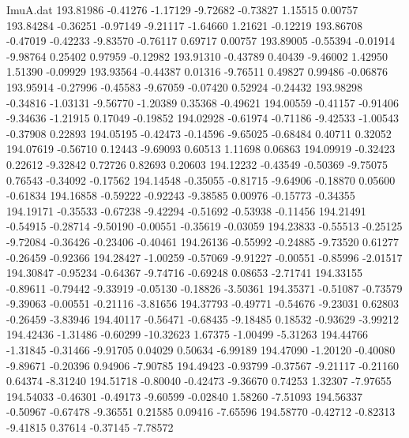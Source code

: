 \begin{filecontents}{ImuA.dat}
 193.81986   -0.41276   -1.17129   -9.72682   -0.73827    1.15515    0.00757
 193.84284   -0.36251   -0.97149   -9.21117   -1.64660    1.21621   -0.12219
 193.86708   -0.47019   -0.42233   -9.83570   -0.76117    0.69717    0.00757
 193.89005   -0.55394   -0.01914   -9.98764    0.25402    0.97959   -0.12982
 193.91310   -0.43789    0.40439   -9.46002    1.42950    1.51390   -0.09929
 193.93564   -0.44387    0.01316   -9.76511    0.49827    0.99486   -0.06876
 193.95914   -0.27996   -0.45583   -9.67059   -0.07420    0.52924   -0.24432
 193.98298   -0.34816   -1.03131   -9.56770   -1.20389    0.35368   -0.49621
 194.00559   -0.41157   -0.91406   -9.34636   -1.21915    0.17049   -0.19852
 194.02928   -0.61974   -0.71186   -9.42533   -1.00543   -0.37908    0.22893
 194.05195   -0.42473   -0.14596   -9.65025   -0.68484    0.40711    0.32052
 194.07619   -0.56710    0.12443   -9.69093    0.60513    1.11698    0.06863
 194.09919   -0.32423    0.22612   -9.32842    0.72726    0.82693    0.20603
 194.12232   -0.43549   -0.50369   -9.75075    0.76543   -0.34092   -0.17562
 194.14548   -0.35055   -0.81715   -9.64906   -0.18870    0.05600   -0.61834
 194.16858   -0.59222   -0.92243   -9.38585    0.00976   -0.15773   -0.34355
 194.19171   -0.35533   -0.67238   -9.42294   -0.51692   -0.53938   -0.11456
 194.21491   -0.54915   -0.28714   -9.50190   -0.00551   -0.35619   -0.03059
 194.23833   -0.55513   -0.25125   -9.72084   -0.36426   -0.23406   -0.40461
 194.26136   -0.55992   -0.24885   -9.73520    0.61277   -0.26459   -0.92366
 194.28427   -1.00259   -0.57069   -9.91227   -0.00551   -0.85996   -2.01517
 194.30847   -0.95234   -0.64367   -9.74716   -0.69248    0.08653   -2.71741
 194.33155   -0.89611   -0.79442   -9.33919   -0.05130   -0.18826   -3.50361
 194.35371   -0.51087   -0.73579   -9.39063   -0.00551   -0.21116   -3.81656
 194.37793   -0.49771   -0.54676   -9.23031    0.62803   -0.26459   -3.83946
 194.40117   -0.56471   -0.68435   -9.18485    0.18532   -0.93629   -3.99212
 194.42436   -1.31486   -0.60299  -10.32623    1.67375   -1.00499   -5.31263
 194.44766   -1.31845   -0.31466   -9.91705    0.04029    0.50634   -6.99189
 194.47090   -1.20120   -0.40080   -9.89671   -0.20396    0.94906   -7.90785
 194.49423   -0.93799   -0.37567   -9.21117   -0.21160    0.64374   -8.31240
 194.51718   -0.80040   -0.42473   -9.36670    0.74253    1.32307   -7.97655
 194.54033   -0.46301   -0.49173   -9.60599   -0.02840    1.58260   -7.51093
 194.56337   -0.50967   -0.67478   -9.36551    0.21585    0.09416   -7.65596
 194.58770   -0.42712   -0.82313   -9.41815    0.37614   -0.37145   -7.78572

\end{filecontents}
